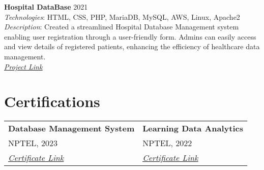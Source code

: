 \documentclass[a4paper,15pt]{article}
\begin{document}
\textbf{Hospital DataBase} \hfill 2021 \\
\textit{Technologies}: HTML, CSS, PHP, MariaDB, MySQL, AWS, Linux, Apache2 \\
\textit{Description}: Created a streamlined Hospital Database Management system enabling user registration through a user-friendly form. Admins can easily access and view details of registered patients, enhancing the efficiency of healthcare data management. \\
\textit{\href{https://github.com/yashasc2k1/webfilesrr}{\underline{Project Link}}}

\section*{Certifications}
\begin{tabular}{@{}ll@{}}
    \textbf{Database Management System}                                                                                            &
    \textbf{Learning Data Analytics}                                                                                                 \\
    NPTEL, 2023                                                                                                                    &
    NPTEL, 2022                                                                                                                      \\
    \textit{\href{https://internalapp.nptel.ac.in/noc/Ecertificate/?q=NPTEL23CS41S1422070903136655}{\underline{Certificate Link}}} &
    \textit{\href{https://archive.nptel.ac.in/noc/Ecertificate/?q=NPTEL22GE26S3394039710215318}{\underline{Certificate Link}}}
\end{tabular}
\end{document}
